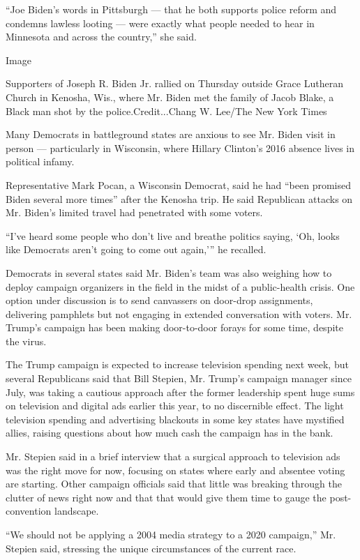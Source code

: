 ``Joe Biden's words in Pittsburgh --- that he both supports police
reform and condemns lawless looting --- were exactly what people needed
to hear in Minnesota and across the country,'' she said.

Image

Supporters of Joseph R. Biden Jr. rallied on Thursday outside Grace
Lutheran Church in Kenosha, Wis., where Mr. Biden met the family of
Jacob Blake, a Black man shot by the police.Credit...Chang W. Lee/The
New York Times

Many Democrats in battleground states are anxious to see Mr. Biden visit
in person --- particularly in Wisconsin, where Hillary Clinton's 2016
absence lives in political infamy.

Representative Mark Pocan, a Wisconsin Democrat, said he had ``been
promised Biden several more times'' after the Kenosha trip. He said
Republican attacks on Mr. Biden's limited travel had penetrated with
some voters.

``I've heard some people who don't live and breathe politics saying,
`Oh, looks like Democrats aren't going to come out again,''' he
recalled.

Democrats in several states said Mr. Biden's team was also weighing how
to deploy campaign organizers in the field in the midst of a
public-health crisis. One option under discussion is to send canvassers
on door-drop assignments, delivering pamphlets but not engaging in
extended conversation with voters. Mr. Trump's campaign has been making
door-to-door forays for some time, despite the virus.

The Trump campaign is expected to increase television spending next
week, but several Republicans said that Bill Stepien, Mr. Trump's
campaign manager since July, was taking a cautious approach after the
former leadership spent huge sums on television and digital ads earlier
this year, to no discernible effect. The light television spending and
advertising blackouts in some key states have mystified allies, raising
questions about how much cash the campaign has in the bank.

Mr. Stepien said in a brief interview that a surgical approach to
television ads was the right move for now, focusing on states where
early and absentee voting are starting. Other campaign officials said
that little was breaking through the clutter of news right now and that
that would give them time to gauge the post-convention landscape.

``We should not be applying a 2004 media strategy to a 2020 campaign,''
Mr. Stepien said, stressing the unique circumstances of the current
race.

